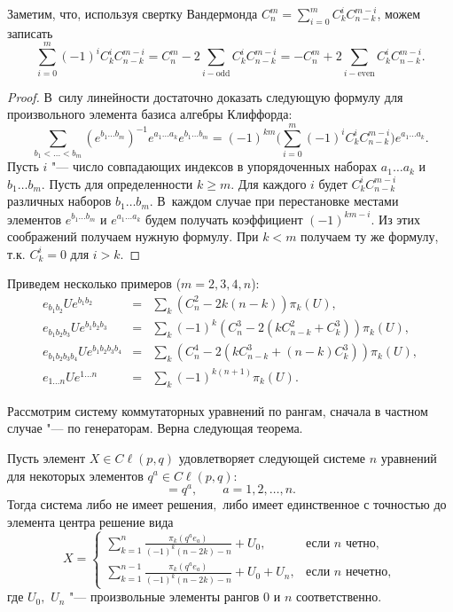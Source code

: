 \smallskip

Заметим, что, используя свертку Вандермонда $C_n^m=\sum_{i=0}^{m}C_k^i C_{n-k}^{m-i}$, можем записать
$$\sum_{i=0}^{m}(-1)^iC_k^i C_{n-k}^{m-i}=C_n^m-2\sum_{i - \text{odd}}C_k^i C_{n-k}^{m-i}=-C_n^m+2\sum_{i - \text{even}}C_k^i C_{n-k}^{m-i}.$$

\smallskip

\begin{proof} В~силу линейности достаточно доказать следующую формулу для произвольного элемента базиса алгебры Клиффорда:
$$\sum_{b_1<\ldots<b_m}(e^{b_1 \ldots b_m})^{-1}e^{a_1\ldots a_k} e^{b_1\ldots b_m}=
(-1)^{km}\biggl (\sum_{i=0}^{m}(-1)^iC_k^i C_{n-k}^{m-i}\biggr)e^{a_1\ldots a_k}.$$
Пусть $i$ "--- число совпадающих индексов в упорядоченных наборах $a_1\ldots a_k$ и $b_1\ldots b_m$. 
Пусть для определенности $k\geq m$. 
Для каждого $i$ будет $C_k^i C_{n-k}^{m-i}$ различных наборов $b_1\ldots b_m$. 
В~каждом случае при перестановке местами элементов $e^{b_1 \ldots b_m}$ и $e^{a_1\ldots a_k}$ будем получать коэффициент $(-1)^{km-i}$. 
Из этих соображений получаем нужную формулу. 
При $k<m$ получаем ту же формулу, т.к. $C_k^i=0$ для $i>k.$
\end{proof}

\smallskip

Приведем несколько примеров ($m=2, 3, 4, n$):
\begin{eqnarray*}
e_{b_1 b_2}U e^{b_1 b_2}&=&\sum_k(C^2_n-2k(n-k))\pi_k(U),\nonumber\\
e_{b_1 b_2 b_3}U e^{b_1 b_2 b_3}&=&\sum_k(-1)^k(C_n^3-2(k C^2_{n-k}+C_k^3))\pi_k(U),\nonumber\\
e_{b_1 b_2 b_3 b_4}U e^{b_1 b_2 b_3 b_4}&=&\sum_k(C_n^4-2(k C^3_{n-k}+(n-k)C_k^3))\pi_k(U),\nonumber\\
e_{1\ldots n}Ue^{1\ldots n}&=&\sum_k(-1)^{k(n+1)}\pi_k(U).\nonumber
\end{eqnarray*}

Рассмотрим систему коммутаторных уравнений по рангам, сначала в частном случае "--- по генераторам. 
Верна следующая теорема.

\smallskip

\begin{theorem}[3]Пусть элемент $X\in {{C}\!\ell}(p,q)$ удовлетворяет следующей системе $n$ уравнений для некоторых элементов $q^{a}\in{{C}\!\ell}(p,q){:}$
\begin{equation}
[e^{a}, X]=q^{a},\qquad a=1, 2,\ldots, n.
\end{equation}
Тогда система либо не имеет решения$,$ либо имеет единственное с точностью до элемента центра решение вида
\begin{equation}
X=
\left\lbrace
\begin{array}{ll}
\displaystyle
\sum_{k=1}^{n}\frac{\pi_k( q^{a} e_{a})}{(-1)^{k}(n-2k)-n}+ U_0,  & \mbox{если $n$ четно},\\[2mm]
\displaystyle
\sum_{k=1}^{n-1}\frac{\pi_k( q^{a} e_{a})}{(-1)^{k}(n-2k)-n}+ U_0 +U_n,  & \mbox{если $n$ нечетно},
\end{array}
\right.
\end{equation}
где $U_0,$ $U_n$ "--- произвольные элементы рангов $0$ и $n$ соответственно\rm.
\end{theorem}

